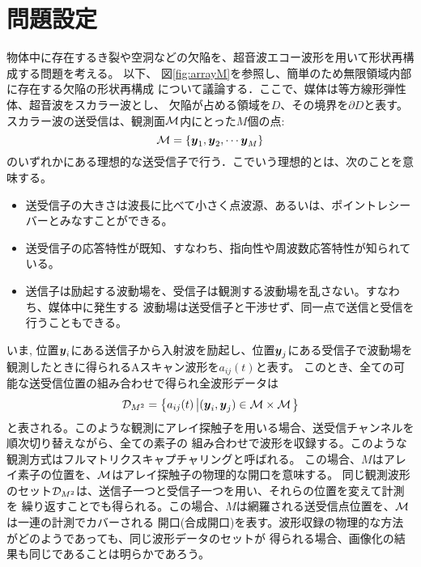 \documentclass[10pt,a4j,dvipdfmx]{jarticle}
\begin{document}
\section{問題設定}
物体中に存在するき裂や空洞などの欠陥を、超音波エコー波形を用いて形状再構成する問題を考える。
以下、 図\ref{fig:arrayM}を参照し、簡単のため無限領域内部に存在する欠陥の形状再構成
について議論する．ここで、媒体は等方線形弾性体、超音波をスカラー波とし、
欠陥が占める領域を$D$、その境界を$\partial D$と表す。
スカラー波の送受信は、観測面$\cal M$内にとった$M$個の点:
\begin{equation}
	{\cal M} =\left\{ 
		\mbox{\boldmath $y$}_1, \mbox{\boldmath $y$}_2, \cdots \mbox{\boldmath $y$}_M
	\right\}
	\label{eqn:}
\end{equation}
のいずれかにある理想的な送受信子で行う．こでいう理想的とは、次のことを意味する。
\begin{itemize}
\item
送受信子の大きさは波長に比べて小さく点波源、あるいは、ポイントレシーバーとみなすことができる。
\item
送受信子の応答特性が既知、すなわち、指向性や周波数応答特性が知られている。
\item
送信子は励起する波動場を、受信子は観測する波動場を乱さない。すなわち、媒体中に発生する
波動場は送受信子と干渉せず、同一点で送信と受信を行うこともできる。
\end{itemize}
いま, 位置$\mbox{\boldmath $y$}_i$にある送信子から入射波を励起し、位置$\mbox{\boldmath $y$}_j$にある受信子で波動場を
観測したときに得られるAスキャン波形を$a_{ij}(t)$と表す。
このとき、全ての可能な送受信位置の組み合わせで得られ全波形データは
\begin{equation}
	{\cal D}_{M^2}= \left\{ a_{ij}(t) \left| (\mbox{\boldmath $y$}_i,\mbox{\boldmath $y$}_j)  \in {\cal M}\times {\cal M} \right.\right\}
	\label{eqn:full_mat}
\end{equation}
と表される。このような観測にアレイ探触子を用いる場合、送受信チャンネルを順次切り替えながら、全ての素子の
組み合わせで波形を収録する。このような観測方式はフルマトリクスキャプチャリングと呼ばれる。
この場合、$M$はアレイ素子の位置を、$\cal M$はアレイ探触子の物理的な開口を意味する。
同じ観測波形のセット${\cal D}_{M^2}$は、送信子一つと受信子一つを用い、それらの位置を変えて計測を
繰り返すことでも得られる。この場合、$M$は網羅される送受信点位置を、$\cal M$は一連の計測でカバーされる
開口(合成開口)を表す。波形収録の物理的な方法がどのようであっても、同じ波形データのセットが
得られる場合、画像化の結果も同じであることは明らかであろう。
\end{document}
